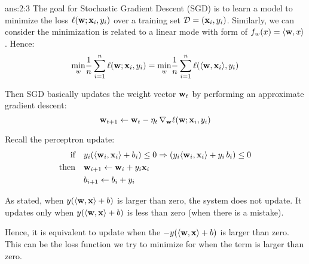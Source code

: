 \documentclass{tron}
\begin{document}
\newpage
\begin{answer}[SGD]{ans:2:3}
	The goal for Stochastic Gradient Descent (SGD) is to learn a model to minimize the loss $\ell(\mathbf{w};\mathbf{x}_i,y_i)$ over a training set $\mathcal{D} = {(\mathbf{x}_i,y_i)}$. Similarly, we can consider the minimization is related to a linear mode with form of $f_w(x)=\langle \mathbf{w}, x \rangle$. Hence:
	\begin{equation}
		\underset{w}{\min} \frac{1}{n} \sum_{i=1}^n{\ell(\mathbf{w};\mathbf{x}_i,y_i)} = \underset{w}{\min}  \frac{1}{n} \sum_{i=1}^n{\ell(\langle \mathbf{w}, \mathbf{x}_i \rangle,y_i)} 
	\end{equation}
	
	Then SGD basically updates the weight vector $\mathbf{w}_t$ by performing an approximate gradient descent:
	\begin{equation}
		\mathbf{w}_{t+1} \leftarrow \mathbf{w}_t - \eta_t \,\nabla_{\mathbf{w}}\ell(\mathbf{w};\mathbf{x}_i,y_i) \label{eqn:q23:sgd_update}
	\end{equation}

    Recall the perceptron update:
    \begin{align}
    	\text{if} \quad & y_i(\langle \mathbf{w}_i, \mathbf{x}_i \rangle + b_i) \leq 0 \Rightarrow (y_i\langle \mathbf{w}_i, \mathbf{x}_i \rangle + y_i\,b_i) \leq 0 \label{eqn:q23:if} \\
    	\text{then}\quad &  \mathbf{w}_{i+1} \leftarrow \mathbf{w}_i + y_i \mathbf{x}_i \label{eqn:q23:wv} \\
    								& b_{i+1} \leftarrow b_i + y_i \label{eqn:q23:b}	
    \end{align}
    
    As  stated, when $y(\langle \mathbf{w}, \mathbf{x} \rangle + b)$ is larger than zero, the system does not update. It updates only when $y(\langle \mathbf{w}, \mathbf{x} \rangle + b)$ is less than zero (when there is a mistake).
    
    Hence, it is equivalent to update when the $- y(\langle \mathbf{w}, \mathbf{x} \rangle + b)$ is larger than zero. This can be the loss function we try to minimize for when the term is larger than zero.
    

\end{answer}
\end{document}
